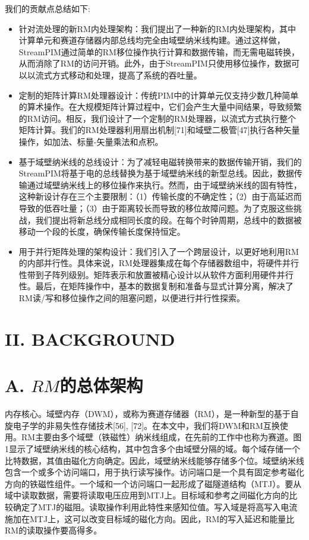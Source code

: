 \documentclass[10pt]{article}
\begin{document}
我们的贡献点总结如下:

\begin{itemize}
  \item 针对流处理的新RM内处理架构：我们提出了一种新的RM内处理架构，其中计算单元和赛道存储器内部总线均完全由域壁纳米线构建。通过这样做，StreamPIM通过简单的RM移位操作执行计算和数据传输，而无需电磁转换，从而消除了RM的访问开销。此外，由于StreamPIM只使用移位操作，数据可以以流式方式移动和处理，提高了系统的吞吐量。
  
  \item 定制的矩阵计算RM处理器设计：传统PIM中的计算单元仅支持少数几种简单的算术操作。在大规模矩阵计算过程中，它们会产生大量中间结果，导致频繁的RM访问。相反，我们设计了一个定制的RM处理器，以流式方式执行整个矩阵计算。我们的RM处理器利用扇出机制[71]和域壁二极管[47]执行各种矢量操作，如加法、标量-矢量乘法和点积。

  \item 基于域壁纳米线的总线设计：为了减轻电磁转换带来的数据传输开销，我们的StreamPIM将基于电的总线替换为基于域壁纳米线的新型总线。因此，数据传输通过域壁纳米线上的移位操作来执行。然而，由于域壁纳米线的固有特性，这种新设计存在三个主要限制：（1）传输长度的不确定性；（2）由于高延迟而导致的低吞吐量；（3）由于距离较长而导致的移位故障问题。为了克服这些挑战，我们提出将新总线分成相同长度的段。在每个时钟周期，总线中的数据被移动一个段的长度，确保传输长度保持恒定。

  \item 用于并行矩阵处理的架构设计：我们引入了一个跨层设计，以更好地利用RM的内部并行性。具体来说，RM处理器集成在每个存储器数组中，将硬件并行性带到子阵列级别。矩阵表示和放置被精心设计以从软件方面利用硬件并行性。最后，在矩阵操作中，基本的数据复制和准备与显式计算分离，解决了RM读/写和移位操作之间的阻塞问题，以便进行并行性探索。

\end{itemize}

\section*{II. BACKGROUND}
\section*{A.  $R M$的总体架构}
内存核心。域壁内存（DWM），或称为赛道存储器（RM），是一种新型的基于自旋电子学的非易失性存储技术[56], [72]。在本文中，我们将DWM和RM互换使用。RM主要由多个域壁（铁磁性）纳米线组成，在先前的工作中也称为赛道。图1显示了域壁纳米线的核心结构，其中包含多个由域壁分隔的域。每个域存储一个比特数据，其值由磁化方向确定。因此，域壁纳米线能够存储多个位。域壁纳米线包含一个或多个访问端口，用于执行读写操作。访问端口是一个具有固定参考磁化方向的铁磁性组件。一个域和一个访问端口一起形成了磁隧道结构（MTJ）。要从域中读取数据，需要将读取电压应用到MTJ上。目标域和参考之间磁化方向的比较确定了MTJ的磁阻。读取操作利用此特性来感知位值。写入域是将高写入电流施加在MTJ上，这可以改变目标域的磁化方向。因此，RM的写入延迟和能量比RM的读取操作要高得多。
\end{document}
